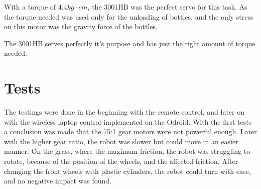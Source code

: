 With a torque of $4.4kg \cdot cm$, the 3001HB was the perfect servo for this task. As the torque needed was used only for the unloading of bottles, and the only stress on this motor was the gravity force of the bottles. 

The 3001HB serves perfectly it's purpose and has just the right amount of torque needed.

\section{Tests}

The testings were done in the beginning with the remote control, and later on with the wireless laptop control implemented on the Odroid. With the first tests a conclusion was made that the 75:1 gear motors were not powerful enough. Later with the higher gear ratio, the robot was slower but could move in an easier manner. On the grass, where the maximum friction, the robot was struggling to rotate, because of the position of the wheels, and the affected friction. After changing the front wheels with plastic cylinders, the robot could turn with ease, and no negative impact was found. 